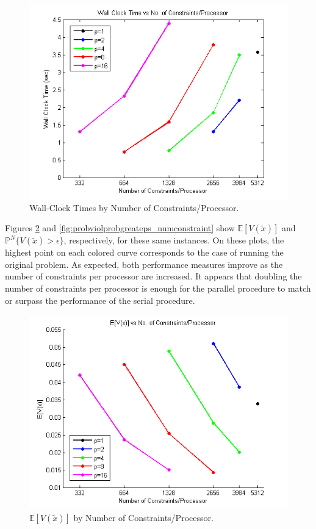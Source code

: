 \documentclass[12pt]{article}
\begin{document}
\begin{figure}[ht]
	\centering
		\includegraphics[scale=0.9]{../plot/figs/wct_numconstraint.png}
	\caption{Wall-Clock Times by Number of Constraints/Processor.}
	\label{fig:wct_numconstraint}
\end{figure}

Figures \ref{fig:expviolprob_numconstraint} and \ref{fig:probviolprobgreateps_numconstraint} show $\mathbb{E}[V(\tilde{x})]$ and $\mathbb{P}^N\{V(\tilde{x}) > \epsilon \}$, respectively, for these same instances.
On these plots, the highest point on each colored curve corresponds to the case of running the original problem.
As expected, both performance measures improve as the number of constraints per processor are increased.
It appears that doubling the number of constraints per processor is enough for the parallel procedure to match or surpass the performance of the serial procedure.

\begin{figure}[ht]
	\centering
		\includegraphics[scale=0.9]{../plot/figs/expviolprob_numconstraint.png}
	\caption{$\mathbb{E}[V(\tilde{x})]$ by Number of Constraints/Processor.}
	\label{fig:expviolprob_numconstraint}
\end{figure}
\end{document}
